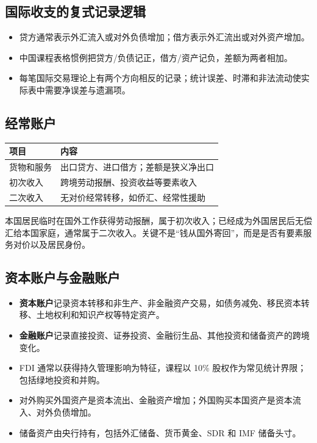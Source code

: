 \documentclass[UTF8,11pt,a4paper]{ctexart}
\newcommand{\term}[1]{\textbf{#1}}
\begin{document}
\subsection{国际收支的复式记录逻辑}
\begin{itemize}
  \item 贷方通常表示外汇流入或对外负债增加；借方表示外汇流出或对外资产增加。
  \item 中国课程表格惯例把贷方/负债记正，借方/资产记负，差额为两者相加。
  \item 每笔国际交易理论上有两个方向相反的记录；统计误差、时滞和非法流动使实际表中需要净误差与遗漏项。
\end{itemize}

\subsection{经常账户}
\begin{longtable}{p{}p{}}
\toprule
项目 & 内容\\
\midrule
货物和服务 & 出口贷方、进口借方；差额是狭义净出口\\
初次收入 & 跨境劳动报酬、投资收益等要素收入\\
二次收入 & 无对价经常转移，如侨汇、经常性援助\\
\bottomrule
\end{longtable}

\begin{warningbox}[侨汇分类]
本国居民临时在国外工作获得劳动报酬，属于初次收入；已经成为外国居民后无偿汇给本国家庭，通常属于二次收入。关键不是“钱从国外寄回”，而是是否有要素服务对价以及居民身份。
\end{warningbox}

\subsection{资本账户与金融账户}
\begin{itemize}
  \item \term{资本账户}记录资本转移和非生产、非金融资产交易，如债务减免、移民资本转移、土地权利和知识产权等特定资产。
  \item \term{金融账户}记录直接投资、证券投资、金融衍生品、其他投资和储备资产的跨境变化。
  \item FDI 通常以获得持久管理影响为特征，课程以 10\% 股权作为常见统计界限；包括绿地投资和并购。
  \item 对外购买外国资产是资本流出、金融资产增加；外国购买本国资产是资本流入、对外负债增加。
  \item 储备资产由央行持有，包括外汇储备、货币黄金、SDR 和 IMF 储备头寸。
\end{itemize}
\end{document}
